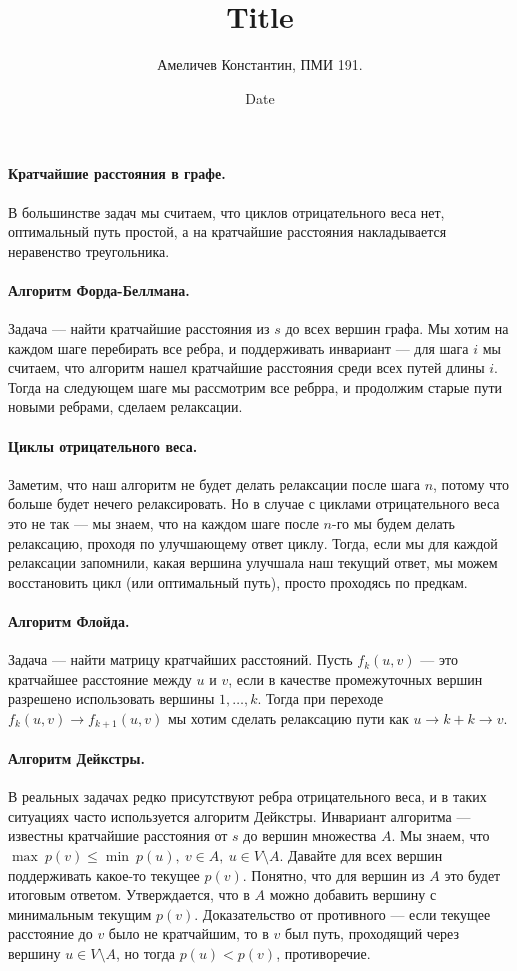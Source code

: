 \documentclass[12pt]{article}
\title{Title}
\author{Амеличев Константин, ПМИ 191.}
\date{Date}
\begin{document}
\paragraph{Кратчайшие расстояния в графе.} В большинстве задач мы считаем, что циклов отрицательного веса нет, оптимальный путь простой, а на кратчайшие расстояния накладывается неравенство треугольника.

\paragraph{Алгоритм Форда-Беллмана.} Задача --- найти кратчайшие расстояния из $s$ до всех вершин графа. Мы хотим на каждом шаге перебирать все ребра, и поддерживать инвариант --- для шага $i$ мы считаем, что алгоритм нашел кратчайшие расстояния среди всех путей длины $i$. Тогда на следующем шаге мы рассмотрим все ребрра, и продолжим старые пути новыми ребрами, сделаем релаксации.

\paragraph{Циклы отрицательного веса.} Заметим, что наш алгоритм не будет делать релаксации после шага $n$, потому что больше будет нечего релаксировать. Но в случае с циклами отрицательного веса это не так --- мы знаем, что на каждом шаге после $n$-го мы будем делать релаксацию, проходя по улучшающему ответ циклу. Тогда, если мы для каждой релаксации запомнили, какая вершина улучшала наш текущий ответ, мы можем восстановить цикл (или оптимальный путь), просто проходясь по предкам.

\paragraph{Алгоритм Флойда.} Задача --- найти матрицу кратчайших расстояний. Пусть $f_k(u, v)$ --- это кратчайшее расстояние между $u$ и $v$, если в качестве промежуточных вершин разрешено использовать вершины $1, \ldots, k$. Тогда при переходе $f_k(u, v) \rightarrow f_{k+1}(u, v)$ мы хотим сделать релаксацию пути как $u \rightarrow k + k \rightarrow v$.

\paragraph{Алгоритм Дейкстры.} В реальных задачах редко присутствуют ребра отрицательного веса, и в таких ситуациях часто используется алгоритм Дейкстры. Инвариант алгоритма --- известны кратчайшие расстояния от $s$ до вершин множества $A$. Мы знаем, что $\max\ p(v) \le \min\ p(u),\ v \in A,\ u \in V \setminus A$. Давайте для всех вершин поддерживать какое-то текущее $p(v)$. Понятно, что для вершин из $A$ это будет итоговым ответом. Утверждается, что в $A$ можно добавить вершину с минимальным текущим $p(v)$. Доказательство от противного --- если текущее расстояние до $v$ было не кратчайшим, то в $v$ был путь, проходящий через вершину $u \in V \setminus A$, но тогда $p(u) < p(v)$, противоречие.
\end{document}
